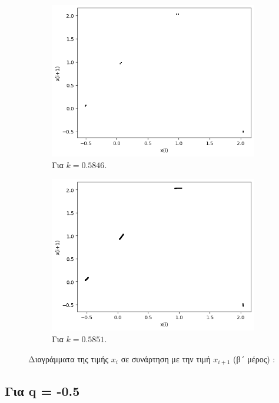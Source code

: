 \begin{figure}[h!]
\begin{subfigure}[b]{0.4\textwidth}
		\includegraphics[width=\textwidth]{LateX images/graphs q03/g13}
		\caption{Για $k=0.5846$.}
		\label{f:k25}
	\end{subfigure}
	\hfill
	\begin{subfigure}[b]{0.4\textwidth}
		\centering
		\includegraphics[width=\textwidth]{LateX images/graphs q03/g14}
		\caption{Για $k=0.5851$.}
		\label{f:k26}
	\end{subfigure}
\caption{Διαγράμματα της τιμής \(x_i\) σε συνάρτηση με την τιμή \(x_{i+1}\) (β´ μέρος) :}	
\end{figure}

\clearpage

\subsection{Για q = -0.5}

